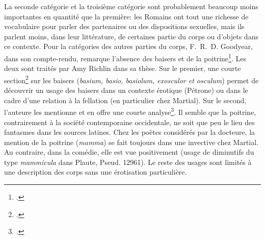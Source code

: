 La seconde catégorie et la troisième catégorie sont probablement beaucoup moins importantes en quantité que la première: les Romains ont tout une richesse de vocabulaire pour parler des partenaires ou des dispositions sexuelles, mais ils parlent moins, dans leur littérature, de certaines partie du corps ou d'objets dans ce contexte. Pour la catégories des autres parties du corps, F.~R.~D. Goodyear, dans son compte-rendu, remarque l'absence des baisers et de la poitrine\footcite{goodyear_praefanda_1985}. Les deux sont traités par Amy Richlin dans sa thèse. Sur le premier, une courte section\footcite[pp.~351--354]{richlin_sexual_1978} sur les baisers (\textit{basium, basio, basiolum, exosculor et osculum}) permet de découvrir un usage des baisers dans un contexte érotique (Pétrone) ou dans le cadre d'une relation à la fellation (en particulier chez Martial). Sur le second, l'auteure les mentionne et en offre une courte analyse\footcite[pp.~229--232]{richlin_sexual_1978}. Il semble que la poitrine, contrairement à la société contemporaine occidentale, ne soit que peu le lieu des fantasmes dans les sources latines. Chez les poètes considérés par la docteure, la mention de la poitrine (\textit{mamma}) se fait toujours dans une invective chez Martial. Au contraire, dans la comédie, elle est vue positivement (usage de diminutifs du type \textit{mammicula} dans Plaute, Pseud. 12961). Le reste des usages sont limités à une description des corps sans une érotisation particulière.

